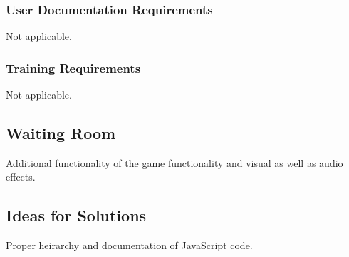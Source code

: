 \documentclass[11pt, oneside]{article}   	%
\begin{document}
\subsubsection{User Documentation Requirements}
Not applicable.


\subsubsection{Training Requirements}
Not applicable.


\subsection{Waiting Room}
Additional functionality of the game functionality and visual as well as audio effects.


\subsection{Ideas for Solutions}
Proper heirarchy and documentation of JavaScript code.


\end{document}
